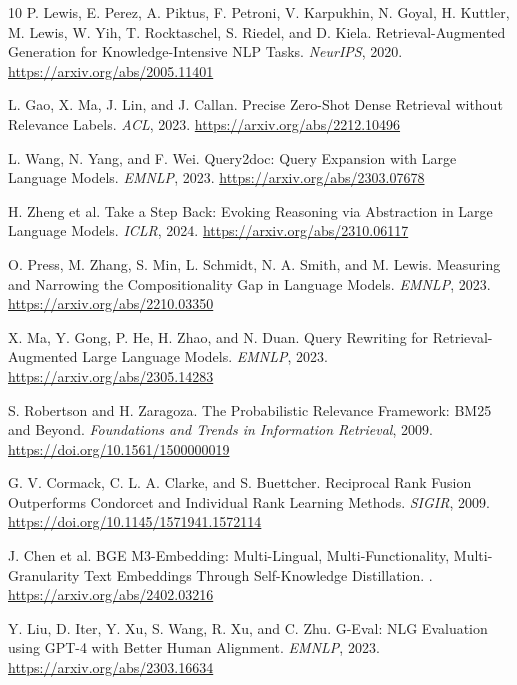 \documentclass[10pt,a4paper,twocolumn]{article}
\begin{document}
\begin{thebibliography}{10}
P. Lewis, E. Perez, A. Piktus, F. Petroni, V. Karpukhin, N. Goyal, H. Kuttler, M. Lewis, W. Yih, T. Rocktaschel, S. Riedel, and D. Kiela.
\newblock Retrieval-Augmented Generation for Knowledge-Intensive NLP Tasks.
\newblock \emph{NeurIPS}, 2020. \url{https://arxiv.org/abs/2005.11401}

L. Gao, X. Ma, J. Lin, and J. Callan.
\newblock Precise Zero-Shot Dense Retrieval without Relevance Labels.
\newblock \emph{ACL}, 2023. \url{https://arxiv.org/abs/2212.10496}

L. Wang, N. Yang, and F. Wei.
\newblock Query2doc: Query Expansion with Large Language Models.
\newblock \emph{EMNLP}, 2023. \url{https://arxiv.org/abs/2303.07678}

H. Zheng et al.
\newblock Take a Step Back: Evoking Reasoning via Abstraction in Large Language Models.
\newblock \emph{ICLR}, 2024. \url{https://arxiv.org/abs/2310.06117}

O. Press, M. Zhang, S. Min, L. Schmidt, N. A. Smith, and M. Lewis.
\newblock Measuring and Narrowing the Compositionality Gap in Language Models.
\newblock \emph{EMNLP}, 2023. \url{https://arxiv.org/abs/2210.03350}

X. Ma, Y. Gong, P. He, H. Zhao, and N. Duan.
\newblock Query Rewriting for Retrieval-Augmented Large Language Models.
\newblock \emph{EMNLP}, 2023. \url{https://arxiv.org/abs/2305.14283}

S. Robertson and H. Zaragoza.
\newblock The Probabilistic Relevance Framework: BM25 and Beyond.
\newblock \emph{Foundations and Trends in Information Retrieval}, 2009. \url{https://doi.org/10.1561/1500000019}

G. V. Cormack, C. L. A. Clarke, and S. Buettcher.
\newblock Reciprocal Rank Fusion Outperforms Condorcet and Individual Rank Learning Methods.
\newblock \emph{SIGIR}, 2009. \url{https://doi.org/10.1145/1571941.1572114}

J. Chen et al.
\newblock BGE M3-Embedding: Multi-Lingual, Multi-Functionality, Multi-Granularity Text Embeddings Through Self-Knowledge Distillation.
. \url{https://arxiv.org/abs/2402.03216}

Y. Liu, D. Iter, Y. Xu, S. Wang, R. Xu, and C. Zhu.
\newblock G-Eval: NLG Evaluation using GPT-4 with Better Human Alignment.
\newblock \emph{EMNLP}, 2023. \url{https://arxiv.org/abs/2303.16634}
\end{thebibliography}
\end{document}
